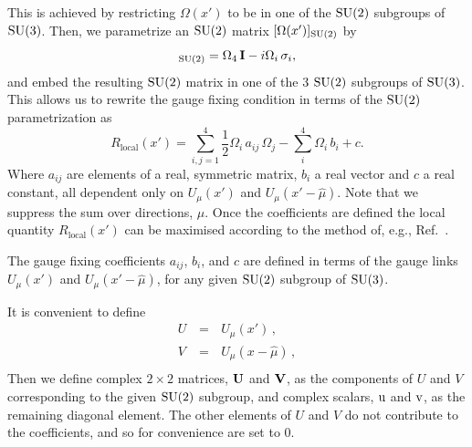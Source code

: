 \documentclass[
 reprint,
 amsmath,amssymb,
 aps,
prd,
]{revtex4-1}
\begin{document}
This is achieved by restricting $\Omega(x')$ to be in one of the $\mathrm{SU}(2)$ subgroups of $\mathrm{SU}(3)$. Then, we parametrize an $\mathrm{SU}(2)$ matrix $[\Omega(x')]_{\mathrm{SU}(2)}$ by
\begin{equation}
[\Omega(x')]_{\SU{2}} = \Omega_{4}\,\identity - i\Omega_{i}\,\sigma_{i},
\end{equation}
and embed the resulting $\mathrm{SU}(2)$ matrix in one of the 3 $\mathrm{SU}(2)$ subgroups of $\mathrm{SU}(3)$. This allows us to rewrite the gauge fixing condition in terms of the $\mathrm{SU}(2)$ parametrization as
\begin{equation}
R_{\textrm{local}}(x') = \sum_{i,j=1}^{4} \frac{1}{2} \Omega_{i}\,a_{ij}\,\Omega_{j} - \sum_{i}^{4}\Omega_{i}\,b_{i} + c.
\end{equation}
Where $a_{ij}$ are elements of a real, symmetric matrix, $b_{i}$ a real vector and $c$ a real constant, all dependent only on $U_{\mu}(x')$ and $U_{\mu}(x' - \hat{\mu})$. Note that we suppress the sum over directions, $\mu$. Once the coefficients are defined the local quantity $R_{\textrm{local}}(x')$ can be maximised according to the method of, e.g., Ref.~\cite{QCQPpaper}.

The gauge fixing coefficients $a_{ij}$, $b_{i}$, and $c$ are defined in terms of the gauge links $U_{\mu}(x')$ and $U_{\mu}(x' - \hat{\mu})$, for any given $\mathrm{SU}(2)$ subgroup of $\mathrm{SU}(3)$.

It is convenient to define
\begin{eqnarray}
U \, &=& \,U_{\mu}(x')\,, \nonumber \\
V \, &=& \,U_{\mu}(x - \hat{\mu})\,, \nonumber \\
\end{eqnarray}
Then we define complex $2 \times 2$ matrices, ${\bf U}$ and ${\bf V}$, as the components of $U$ and $V$ corresponding to the given $\mathrm{SU}(2)$ subgroup, and complex scalars, $\mathrm{u}$ and $\mathrm{v}$, as the remaining diagonal element. The other elements of $U$ and $V$ do not contribute to the coefficients, and so for convenience are set to $0$.
\end{document}
